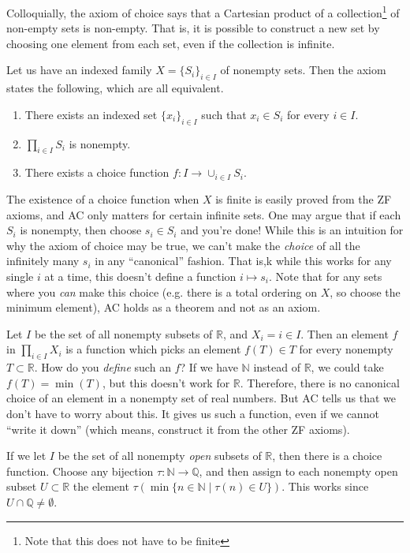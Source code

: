 \documentclass{article}
\begin{document}
    Colloquially, the axiom of choice says that a Cartesian product of a collection\footnote{Note that this does not have to be finite} of non-empty sets is non-empty. That is, it is possible to construct a new set by choosing one element from each set, even if the collection is infinite. 

    \begin{axiom}
      Let us have an indexed family $X = \{S_i\}_{i \in I}$ of nonempty sets. Then the axiom states the following, which are all equivalent. 
      \begin{enumerate}
        \item There exists an indexed set $\{x_i\}_{i \in I}$ such that $x_i \in S_i$ for every $i \in I$. 
        \item $\prod_{i \in I} S_i$ is nonempty. 
        \item There exists a choice function $f: I \rightarrow \cup_{i \in I} S_i$. 
      \end{enumerate}
    \end{axiom}

    The existence of a choice function when $X$ is finite is easily proved from the ZF axioms, and AC only matters for certain infinite sets. One may argue that if each $S_i$ is nonempty, then choose $s_i \in S_i$ and you're done! While this is an intuition for why the axiom of choice may be true, we can't make the \textit{choice} of all the infinitely many $s_i$ in any ``canonical'' fashion. That is,k while this works for any single $i$ at a time, this doesn't define a function $i \mapsto s_i$. Note that for any sets where you \textit{can} make this choice (e.g. there is a total ordering on $X$, so choose the minimum element), AC holds as a theorem and not as an axiom. 

    \begin{example}
      Let $I$ be the set of all nonempty subsets of $\mathbb{R}$, and $X_i = i \in I$. Then an element $f$ in $\prod_{i \in I} X_i$ is a function which picks an element $f(T) \in T$ for every nonempty $T \subset \mathbb{R}$. How do you \textit{define} such an $f$? If we have $\mathbb{N}$ instead of $\mathbb{R}$, we could take $f(T) = \min(T)$, but this doesn't work for $\mathbb{R}$. Therefore, there is no canonical choice of an element in a nonempty set of real numbers. But AC tells us that we don't have to worry about this. It gives us such a function, even if we cannot ``write it down'' (which means, construct it from the other ZF axioms).  

      If we let $I$ be the set of all nonempty \textit{open} subsets of $\mathbb{R}$, then there is a choice function. Choose any bijection $\tau: \mathbb{N} \rightarrow \mathbb{Q}$, and then assign to each nonempty open subset $U \subset \mathbb{R}$ the element $\tau (\min\{n \in \mathbb{N} \mid \tau(n) \in U\})$. This works since $U \cap \mathbb{Q} \neq \emptyset$. 
    \end{example}
\end{document}
